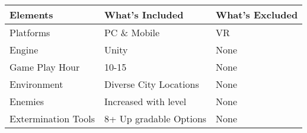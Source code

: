 \begin{tabular}{l|l|l}

\textbf{Elements}& \textbf{ What's Included} & \textbf{ What's Excluded} \\
\hline
Platforms & PC \& Mobile & VR \\ 
\hline
Engine & Unity & None \\
\hline
Game Play Hour & 10-15 & None \\
\hline
Environment & Diverse City Locations & None \\
\hline
Enemies & Increased with level & None \\
\hline
Extermination Tools & 8+ Up gradable Options & None \\
\hline

\end{tabular}


